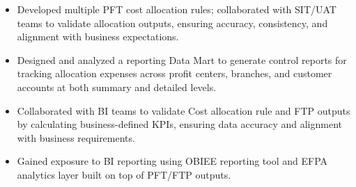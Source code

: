 

\begin{itemize}
  \item Developed multiple PFT cost allocation rules; collaborated with SIT/UAT teams to validate allocation outputs, ensuring accuracy, consistency, and alignment with business expectations.
  \item Designed and analyzed a reporting Data Mart to generate control reports for tracking allocation expenses across profit centers, branches, and customer accounts at both summary and detailed levels.
  \item Collaborated with BI teams to validate Cost allocation rule and FTP outputs by calculating business-defined KPIs, ensuring data accuracy and alignment with business requirements.
  \item Gained exposure to BI reporting using OBIEE reporting tool and EFPA analytics layer built on top of PFT/FTP outputs.
\end{itemize}
